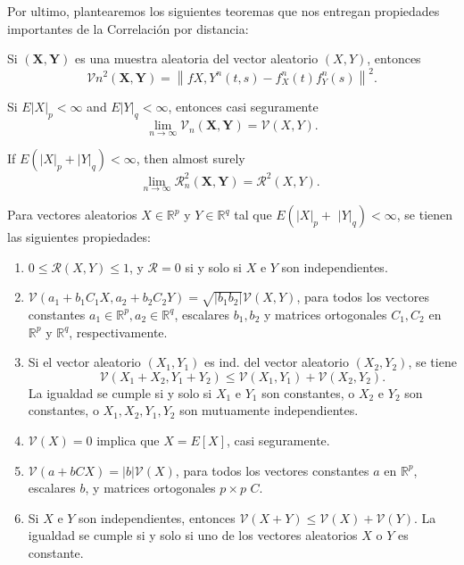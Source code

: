 	Por ultimo, plantearemos los siguientes teoremas que nos entregan  propiedades importantes de la Correlaci\'on por distancia:

	\begin{thm}
		Si $(\mathbf{X}, \mathbf{Y})$ es una muestra aleatoria del vector aleatorio $(X, Y)$, entonces
		$$
		\mathcal{V}n^2(\mathbf{X}, \mathbf{Y})=\left\|f{X, Y}^n(t, s)-f_X^n(t) f_Y^n(s)\right\|^2 .
		$$
	\end{thm}
	\begin{thm}
		Si $E|X|_p<\infty$ and $E|Y|_q<\infty$, entonces casi seguramente
		$$
		\lim _{n \rightarrow \infty} \mathcal{V}_n(\mathbf{X}, \mathbf{Y})=\mathcal{V}(X, Y) .
		$$
	\end{thm}
	
	\begin{cor}
		If $E\left(|X|_p+|Y|_q\right)<\infty$, then almost surely
		$$
		\lim _{n \rightarrow \infty} \mathcal{R}_n^2(\mathbf{X}, \mathbf{Y})=\mathcal{R}^2(X, Y) \text {. }
		$$
	\end{cor}
	\begin{thm}\label{thm3_brcov}
		Para vectores aleatorios $X \in \mathbb{R}^p$ y $Y \in \mathbb{R}^q$ tal que $E\left(|X|_p+\right.$ $\left.|Y|_q\right)<\infty$, se tienen las siguientes propiedades:
		\begin{enumerate}
			\item $0 \leq \mathcal{R}(X, Y) \leq 1$, y $\mathcal{R}=0$ si y solo si $X$ e $Y$ son independientes.
			\item $\mathcal{V}\left(a_1+b_1 C_1 X, a_2+b_2 C_2 Y\right)=\sqrt{\left|b_1 b_2\right|} \mathcal{V}(X, Y)$, para todos los vectores constantes $a_1 \in \mathbb{R}^p, a_2 \in \mathbb{R}^q$, escalares $b_1, b_2$ y matrices ortogonales $C_1, C_2$ en $\mathbb{R}^p$ y $\mathbb{R}^q$, respectivamente.	
			\item Si el vector aleatorio $\left(X_1, Y_1\right)$ es ind. del vector aleatorio $\left(X_2, Y_2\right)$, se tiene
			 $$
			\mathcal{V}\left(X_1+X_2, Y_1+Y_2\right) \leq \mathcal{V}\left(X_1, Y_1\right)+\mathcal{V}\left(X_2, Y_2\right) .
			$$
			La igualdad se cumple si y solo si $X_1$ e $Y_1$ son constantes, o $X_2$ e $Y_2$ son constantes, o $X_1, X_2, Y_1, Y_2$ son mutuamente independientes.

			\item $\mathcal{V}(X)=0$ implica que $X=E[X]$, casi seguramente.
			\item $\mathcal{V}(a+b C X)=|b| \mathcal{V}(X)$, para todos los vectores constantes $a$ en $\mathbb{R}^p$, escalares $b$, y matrices ortogonales $p \times p$ $C$.
			\item Si $X$ e $Y$ son independientes, entonces $\mathcal{V}(X+Y) \leq \mathcal{V}(X)+\mathcal{V}(Y)$. La igualdad se cumple si y solo si uno de los vectores aleatorios $X$ o $Y$ es constante.
		\end{enumerate}
	\end{thm}
